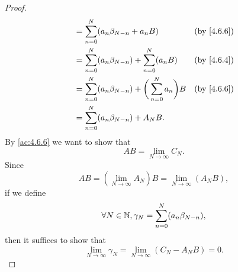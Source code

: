 \begin{proof}
\begin{align*}
                          & = \sum_{n = 0}^N (a_n \beta_{N - n} + a_n B)                            &  & \text{(by \cref{4.6.6})} \\
                          & = \sum_{n = 0}^N (a_n \beta_{N - n}) + \sum_{n = 0}^N (a_n B)           &  & \text{(by \cref{4.6.4})} \\
                          & = \sum_{n = 0}^N (a_n \beta_{N - n}) + \bigg(\sum_{n = 0}^N a_n\bigg) B &  & \text{(by \cref{4.6.6})} \\
                          & = \sum_{n = 0}^N (a_n \beta_{N - n}) + A_N B.
  \end{align*}
  By \cref{ac:4.6.6} we want to show that
  \[
    AB = \lim_{N \to \infty} C_N.
  \]
  Since
  \[
    AB = (\lim_{N \to \infty} A_N) B = \lim_{N \to \infty} (A_N B),
  \]
  if we define
  \[
    \forall N \in \mathbb{N}, \gamma_N = \sum_{n = 0}^N (a_n \beta_{N - n}),
  \]
  then it suffices to show that
  \[
    \lim_{N \to \infty} \gamma_N = \lim_{N \to \infty} (C_N - A_N B) = 0.
  \]


\end{proof}

